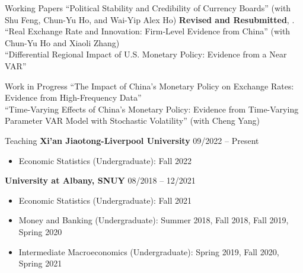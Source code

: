 \documentclass{resume_liang} %
\begin{document}
\begin{rSection}{Working Papers}
``Political Stability and Credibility of Currency Boards'' (with Shu Feng, Chun-Yu Ho, and Wai-Yip Alex Ho) \textbf{Revised and Resubmitted}, \textit{}.
\vspace{0.1cm} \\
``Real Exchange Rate and Innovation: Firm-Level Evidence from China'' (with Chun-Yu Ho and Xiaoli Zhang) 
\vspace{0.1cm} \\
``Differential Regional Impact of U.S. Monetary Policy: Evidence from a Near VAR''
\vspace{0.1cm} \\
\end{rSection}
\bigskip  



\begin{rSection}{Work in Progress}
``The Impact of China's Monetary Policy on Exchange Rates: Evidence from High-Frequency Data''
\vspace{0.1cm}\\
``Time-Varying Effects of China's Monetary Policy: Evidence from Time-Varying Parameter VAR Model with Stochastic Volatility'' (with Cheng Yang)
\vspace{0.1cm}\\
\end{rSection}
\bigskip  



\newpage
\begin{rSection}{Teaching}
{\bf Xi'an Jiaotong-Liverpool University} \hfill { 09/2022 -- Present }
\begin{itemize}
	\item[] Economic Statistics (Undergraduate): Fall 2022
\end{itemize} 
{\bf University at Albany, SNUY} \hfill { 08/2018 -- 12/2021 }
 \begin{itemize}
 	 \item[] Economic Statistics (Undergraduate): Fall 2021
     \item[] Money and Banking (Undergraduate): Summer 2018, Fall 2018, Fall 2019, Spring 2020
     \item[] Intermediate Macroeconomics (Undergraduate): Spring 2019, Fall 2020, Spring 2021
 \end{itemize} 
\vspace{0.3cm}
\end{rSection}
\bigskip  
\end{document}
